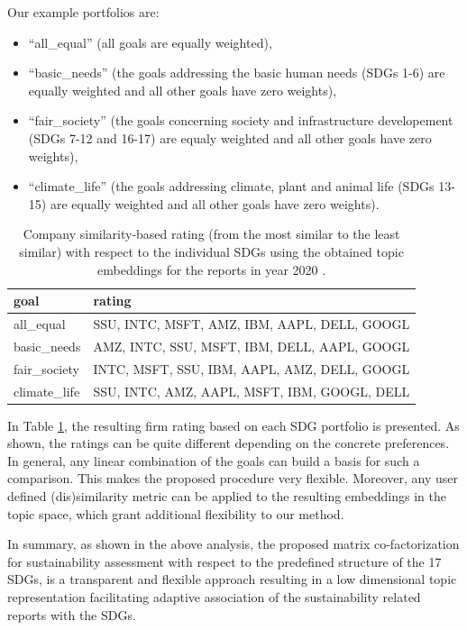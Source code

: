 \documentclass[
]{article}
\providecommand{\tightlist}{%
  \setlength{\itemsep}{0pt}\setlength{\parskip}{0pt}}
\begin{document}
Our example portfolios are:

\begin{itemize}
\tightlist
\item
  ``all\_equal'' (all goals are equally weighted),
\item
  ``basic\_needs'' (the goals addressing the basic human needs (SDGs 1-6) are equally weighted and all other goals have zero weights),
\item
  ``fair\_society'' (the goals concerning society and infrastructure developement (SDGs 7-12 and 16-17) are equaly weighted and all other goals have zero weights),
\item
  ``climate\_life'' (the goals addressing climate, plant and animal life (SDGs 13-15) are equally weighted and all other goals have zero weights).
\end{itemize}

\begin{table}

\caption{\label{tab:tab03}Company similarity-based rating (from the most similar to the least similar) with respect to the individual SDGs using the obtained topic embeddings for the reports in year 2020 .}
\centering
\begin{tabular}[t]{l|l}
\hline
goal & rating\\
\hline
all\_equal & SSU, INTC, MSFT, AMZ, IBM, AAPL, DELL, GOOGL\\
\hline
basic\_needs & AMZ, INTC, SSU, MSFT, IBM, DELL, AAPL, GOOGL\\
\hline
fair\_society & INTC, MSFT, SSU, IBM, AAPL, AMZ, DELL, GOOGL\\
\hline
climate\_life & SSU, INTC, AMZ, AAPL, MSFT, IBM, GOOGL, DELL\\
\hline
\end{tabular}
\end{table}

In Table \ref{tab:tab03}, the resulting firm rating based on each SDG portfolio is presented. As shown, the ratings can be quite different depending on the concrete preferences. In general, any linear combination of the goals can build a basis for such a comparison. This makes the proposed procedure very flexible. Moreover, any user defined (dis)similarity metric can be applied to the resulting embeddings in the topic space, which grant additional flexibility to our method.

In summary, as shown in the above analysis, the proposed matrix co-factorization for sustainability assessment with respect to the predefined structure of the 17 SDGs, is a transparent and flexible approach resulting in a low dimensional topic representation facilitating adaptive association of the sustainability related reports with the SDGs.
\end{document}
